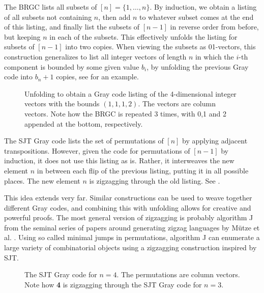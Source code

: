 \documentclass[fontsize=11pt,a4paper,DIV=12]{scrartcl}
\begin{document}
The BRGC lists all subsets of $[n]=\{1,\ldots,n\}$. By induction, we obtain a listing of all subsets not containing $n$, then add $n$ to whatever subset comes at the end of this listing, and finally list the subsets of $[n-1]$ in reverse order from before, but keeping $n$ in each of the subsets. This effectively unfolds the listing for subsets of $[n-1]$ into two copies. When viewing the subsets as 01-vectors, this construction generalizes to list all integer vectors of length $n$ in which the $i$-th component is bounded by some given value $b_i$, by unfolding the previous Gray code into $b_n+1$ copies, see  for an example.

\begin{figure}
	\centering
	
	\caption{Unfolding to obtain a Gray code listing of the 4-dimensional integer vectors with the bounds $(1,1,1,2)$. The vectors are column vectors. Note how the BRGC is repeated 3 times, with 0,1 and 2 appended at the bottom, respectively.}
	\label{fig:unfolding explicit}
\end{figure}

The SJT Gray code lists the set of permutations of $[n]$ by applying adjacent transpositions. However, given the code for permutations of $[n-1]$ by induction, it does not use this listing as is. Rather, it interweaves the new element $n$ in between each flip of the previous listing, putting it in all possible places. The new element $n$ is zigzagging through the old listing. See .

This idea extends very far. Similar constructions can be used to weave together different Gray codes, and combining this with unfolding allows for creative and powerful proofs. The most general version of zigzagging is probably algorithm J from the seminal series of papers around generating zigzag languages by Mütze et al. \cite{PL1,PL2,PL3,PL4,PL5}. Using so called minimal jumps in permutations, algorithm J can enumerate a large variety of combinatorial objects using a zigzagging construction inspired by SJT.

\begin{figure}
	\centering
	
	\caption{The SJT Gray code for $n=4$. The permutations are column vectors. Note how \textbf{4} is zigzagging through the SJT Gray code for $n=3$.}
	\label{fig:SJT_explicit}
\end{figure}
\end{document}
